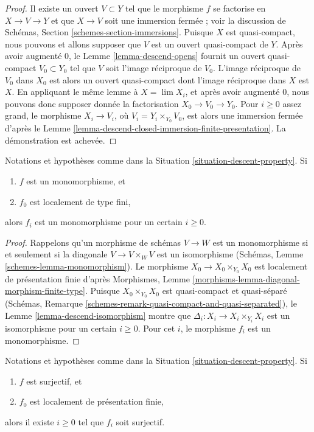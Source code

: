 \begin{proof}
Il existe un ouvert $V \subset Y$ tel que le morphisme $f$ se factorise en
$X \to V \to Y$ et que $X \to V$ soit une immersion fermée ; voir la
discussion de Schémas, Section \ref{schemes-section-immersions}. Puisque $X$
est quasi-compact, nous pouvons et allons supposer que $V$ est un ouvert
quasi-compact de $Y$. Après avoir augmenté $0$, le
Lemme \ref{lemma-descend-opens} fournit un ouvert quasi-compact
$V_0 \subset Y_0$ tel que $V$ soit l'image réciproque de $V_0$. L'image réciproque de
$V_0$ dans $X_0$ est alors un ouvert quasi-compact dont l'image réciproque
dans $X$ est $X$. En appliquant le même lemme à $X = \lim X_i$, et après
avoir augmenté $0$, nous pouvons donc supposer donnée la factorisation
$X_0 \to V_0 \to Y_0$. Pour $i \geq 0$ assez grand, le morphisme
$X_i \to V_i$, où $V_i = Y_i \times_{Y_0} V_0$, est alors une immersion
fermée d'après le
Lemme \ref{lemma-descend-closed-immersion-finite-presentation}. La
démonstration est achevée.
\end{proof}

\begin{lemma}
\label{lemma-descend-monomorphism}
Notations et hypothèses comme dans la
Situation \ref{situation-descent-property}. Si
\begin{enumerate}
\item $f$ est un monomorphisme, et
\item $f_0$ est localement de type fini,
\end{enumerate}
alors $f_i$ est un monomorphisme pour un certain $i \geq 0$.
\end{lemma}

\begin{proof}
Rappelons qu'un morphisme de schémas $V \to W$ est un monomorphisme si et
seulement si la diagonale $V \to V \times_W V$ est un isomorphisme (Schémas,
Lemme \ref{schemes-lemma-monomorphism}). Le morphisme
$X_0 \to X_0 \times_{Y_0} X_0$ est localement de présentation finie d'après
Morphismes, Lemme \ref{morphisms-lemma-diagonal-morphism-finite-type}.
Puisque $X_0 \times_{Y_0} X_0$ est quasi-compact et quasi-séparé (Schémas,
Remarque \ref{schemes-remark-quasi-compact-and-quasi-separated}), le
Lemme \ref{lemma-descend-isomorphism} montre que
$\Delta_i : X_i \to X_i \times_{Y_i} X_i$ est un isomorphisme pour un
certain $i \geq 0$. Pour cet $i$, le morphisme $f_i$ est un monomorphisme.
\end{proof}

\begin{lemma}
\label{lemma-descend-surjective}
Notations et hypothèses comme dans la
Situation \ref{situation-descent-property}. Si
\begin{enumerate}
\item $f$ est surjectif, et
\item $f_0$ est localement de présentation finie,
\end{enumerate}
alors il existe $i \geq 0$ tel que $f_i$ soit surjectif.
\end{lemma}

